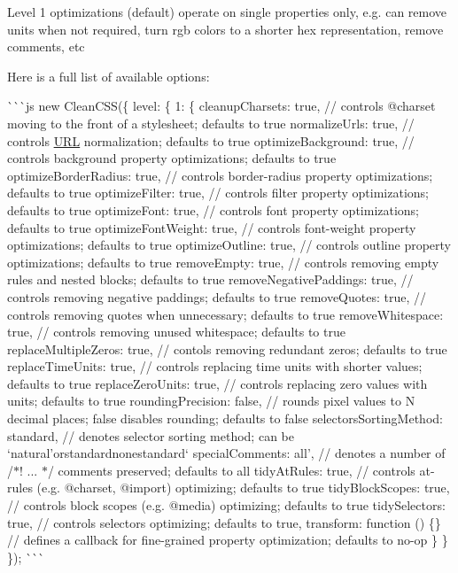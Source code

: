 Level 1 optimizations (default) operate on single properties only, e.\+g. can remove units when not required, turn rgb colors to a shorter hex representation, remove comments, etc

Here is a full list of available options\+:

\`{}\`{}\`{}js new Clean\+C\+SS(\{ level\+: \{ 1\+: \{ cleanup\+Charsets\+: true, // controls {\ttfamily @charset} moving to the front of a stylesheet; defaults to {\ttfamily true} normalize\+Urls\+: true, // controls \mbox{\hyperlink{namespace_u_r_l}{U\+RL}} normalization; defaults to {\ttfamily true} optimize\+Background\+: true, // controls {\ttfamily background} property optimizations; defaults to {\ttfamily true} optimize\+Border\+Radius\+: true, // controls {\ttfamily border-\/radius} property optimizations; defaults to {\ttfamily true} optimize\+Filter\+: true, // controls {\ttfamily filter} property optimizations; defaults to {\ttfamily true} optimize\+Font\+: true, // controls {\ttfamily font} property optimizations; defaults to {\ttfamily true} optimize\+Font\+Weight\+: true, // controls {\ttfamily font-\/weight} property optimizations; defaults to {\ttfamily true} optimize\+Outline\+: true, // controls {\ttfamily outline} property optimizations; defaults to {\ttfamily true} remove\+Empty\+: true, // controls removing empty rules and nested blocks; defaults to {\ttfamily true} remove\+Negative\+Paddings\+: true, // controls removing negative paddings; defaults to {\ttfamily true} remove\+Quotes\+: true, // controls removing quotes when unnecessary; defaults to {\ttfamily true} remove\+Whitespace\+: true, // controls removing unused whitespace; defaults to {\ttfamily true} replace\+Multiple\+Zeros\+: true, // contols removing redundant zeros; defaults to {\ttfamily true} replace\+Time\+Units\+: true, // controls replacing time units with shorter values; defaults to {\ttfamily true} replace\+Zero\+Units\+: true, // controls replacing zero values with units; defaults to {\ttfamily true} rounding\+Precision\+: false, // rounds pixel values to {\ttfamily N} decimal places; {\ttfamily false} disables rounding; defaults to {\ttfamily false} selectors\+Sorting\+Method\+: \textquotesingle{}standard\textquotesingle{}, // denotes selector sorting method; can be `\textquotesingle{}natural'{\ttfamily or}\textquotesingle{}standard\textquotesingle{}{\ttfamily ,}\textquotesingle{}none\textquotesingle{}standard\textquotesingle{}` special\+Comments\+: \textquotesingle{}all', // denotes a number of /$\ast$! ... $\ast$/ comments preserved; defaults to {\ttfamily all} tidy\+At\+Rules\+: true, // controls at-\/rules (e.\+g. {\ttfamily @charset}, {\ttfamily @import}) optimizing; defaults to {\ttfamily true} tidy\+Block\+Scopes\+: true, // controls block scopes (e.\+g. {\ttfamily @media}) optimizing; defaults to {\ttfamily true} tidy\+Selectors\+: true, // controls selectors optimizing; defaults to {\ttfamily true}, transform\+: function () \{\} // defines a callback for fine-\/grained property optimization; defaults to no-\/op \} \} \}); \`{}\`{}\`{}

